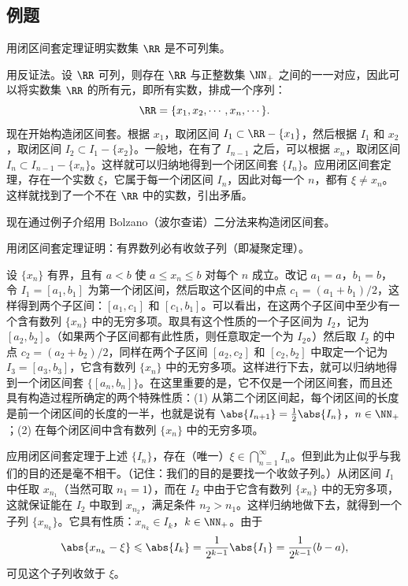 \subsection{例题}

\begin{xexample}[3.2.1]
用闭区间套定理证明实数集 $\RR$ 是不可列集。
\end{xexample}
\begin{xproof}
用反证法。设 $\RR$ 可列，则存在 $\RR$ 与正整数集 $\NN_+$ 之间的一一对应，因此可以将实数集 $\RR$ 的所有元，即所有实数，排成一个序列：
\[
  \RR=\{x_1,x_2,\cdots,x_n,\cdots\}.
\]
现在开始构造闭区间套。根据 $x_1$，取闭区间 $I_1\subset\RR-\{x_1\}$，然后根据 $I_1$ 和 $x_2$，取闭区间 $I_2\subset I_1-\{x_2\}$。一般地，在有了 $I_{n-1}$ 之后，可以根据 $x_n$，取闭区间 $I_n\subset I_{n-1}-\{x_n\}$。这样就可以归纳地得到一个闭区间套 $\{I_n\}$。应用闭区间套定理，存在一个实数 $\xi$，它属于每一个闭区间 $I_n$，因此对每一个 $n$，都有 $\xi\neq x_n$。这样就找到了一个不在 $\RR$ 中的实数，引出矛盾。
\end{xproof}

现在通过例子介绍用 Bolzano（波尔查诺）二分法来构造闭区间套。

\begin{xexample}[3.2.2]
用闭区间套定理证明：有界数列必有收敛子列（即凝聚定理）。
\end{xexample}
\begin{xproof}
设 $\{x_n\}$ 有界，且有 $a<b$ 使 $a\leqslant x_n\leqslant b$ 对每个 $n$ 成立。改记 $a_1=a$，$b_1=b$，令 $I_1=[a_1,b_1]$ 为第一个闭区间，然后取这个区间的中点 $c_1=(a_1+b_1)/2$，这样得到两个子区间：$[a_1,c_1]$ 和 $[c_1,b_1]$。可以看出，在这两个子区间中至少有一个含有数列 $\{x_n\}$ 中的无穷多项。取具有这个性质的一个子区间为 $I_2$，记为 $[a_2,b_2]$。（如果两个子区间都有此性质，则任意取定一个为 $I_2$。）然后取 $I_2$ 的中点 $c_2=(a_2+b_2)/2$，同样在两个子区间 $[a_2,c_2]$ 和 $[c_2,b_2]$ 中取定一个记为 $I_3=[a_3,b_3]$，它含有数列 $\{x_n\}$ 中的无穷多项。这样进行下去，就可以归纳地得到一个闭区间套 $\{[a_n,b_n]\}$。在这里重要的是，它不仅是一个闭区间套，而且还具有构造过程所确定的两个特殊性质：(1) 从第二个闭区间起，每个闭区间的长度是前一个闭区间的长度的一半，也就是说有 $\abs{I_{n+1}}=\frac12\abs{I_n}$，$n\in\NN_+$；(2) 在每个闭区间中含有数列 $\{x_n\}$ 中的无穷多项。

应用闭区间套定理于上述 $\{I_n\}$，存在（唯一）$\xi\in\bigcap_{n=1}^{\infty}I_n$。但到此为止似乎与我们的目的还是毫不相干。（记住：我们的目的是要找一个收敛子列。）从闭区间 $I_1$ 中任取 $x_{n_1}$（当然可取 $n_1=1$），而在 $I_2$ 中由于它含有数列 $\{x_n\}$ 中的无穷多项，这就保证能在 $I_2$ 中取到 $x_{n_2}$，满足条件 $n_2>n_1$。这样归纳地做下去，就得到一个子列 $\{x_{n_k}\}$。它具有性质：$x_{n_k}\in I_k$，$k\in\NN_+$。由于
\[
  \abs{x_{n_k}-\xi}\leqslant\abs{I_k}=\frac1{2^{k-1}}\abs{I_1}=\frac1{2^{k-1}}(b-a),
\]
可见这个子列收敛于 $\xi$。
\end{xproof}

